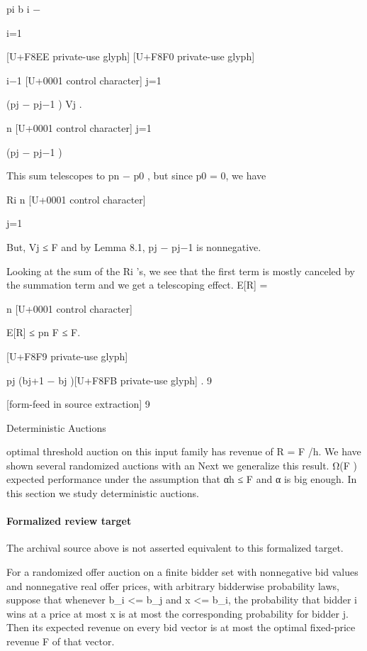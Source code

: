 \documentclass[10pt]{article}
\begin{document}
\begin{ReviewVerbatim}
pi b i −

i=1

[U+F8EE private-use glyph]
[U+F8F0 private-use glyph]

i−1
[U+0001 control character]
j=1

(pj − pj−1 ) Vj .

n
[U+0001 control character]
j=1

(pj − pj−1 )

This sum telescopes to pn − p0 , but since p0 = 0, we
have

Ri
n
[U+0001 control character]

j=1

But, Vj ≤ F and by Lemma 8.1, pj − pj−1 is nonnegative.

Looking at the sum of the Ri ’s, we see that the first
term is mostly canceled by the summation term and
we get a telescoping effect.
E[R] =

n
[U+0001 control character]

E[R] ≤ pn F ≤ F.

[U+F8F9 private-use glyph]

pj (bj+1 − bj )[U+F8FB private-use glyph] .
9


[form-feed in source extraction]
9

Deterministic Auctions

optimal threshold auction on this input family has
revenue of R = F /h.
We have shown several randomized auctions with an
Next we generalize this result.
Ω(F ) expected performance under the assumption
that αh ≤ F and α is big enough. In this section
we study deterministic auctions.
\end{ReviewVerbatim}


\paragraph{Formalized review target}
The archival source above is not asserted equivalent to this formalized target.
\begin{ReviewVerbatim}
For a randomized offer auction on a finite bidder set with nonnegative bid values and nonnegative real offer prices, with arbitrary bidderwise probability laws, suppose that whenever b_i <= b_j and x <= b_i, the probability that bidder i wins at a price at most x is at most the corresponding probability for bidder j. Then its expected revenue on every bid vector is at most the optimal fixed-price revenue F of that vector.
\end{ReviewVerbatim}
\end{document}
